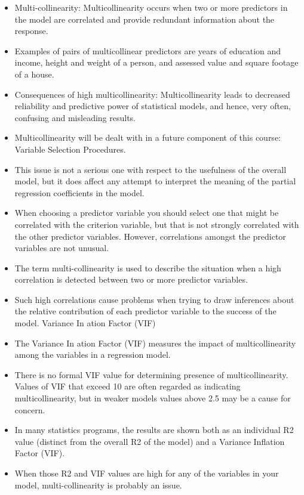 \documentclass[]{report}
\begin{document}
\begin{itemize}
	
	\item  Multi-collinearity: Multicollinearity occurs when two or more predictors in the model are correlated
	and provide redundant information about the response.
	\item  Examples of pairs of multicollinear predictors are years of education and income, height and weight of a
	person, and assessed value and square footage of a house.
	\item  Consequences of high multicollinearity:
	Multicollinearity leads to decreased reliability and predictive power of statistical models, and hence, very
	often, confusing and misleading results.
	\item  Multicollinearity will be dealt with in a future component of this course: Variable Selection Procedures.
	\item  This issue is not a serious one with respect to the usefulness of the overall model, but it does affect any attempt to interpret the meaning of the partial regression coefficients in the model.
	\item  When choosing a predictor variable you should select one that might be correlated with the criterion
	variable, but that is not strongly correlated with the other predictor variables. However, correlations
	amongst the predictor variables are not unusual.
	\item  The term multi-collinearity is used to describe the situation when a high correlation is detected between
	two or more predictor variables.
	\item  Such high correlations cause problems when trying to draw inferences about the relative contribution of
	each predictor variable to the success of the model.
	Variance In
	ation Factor (VIF)
	\item  The Variance In
	ation Factor (VIF) measures the impact of multicollinearity among the variables in a
	regression model.
	\item  There is no formal VIF value for determining presence of multicollinearity. Values of VIF that exceed 10
	are often regarded as indicating multicollinearity, but in weaker models values above 2.5 may be a cause
	for concern.
	\item  In many statistics programs, the results are shown both as an individual R2 value (distinct from the
	overall R2 of the model) and a Variance Inflation Factor (VIF).
	\item  When those R2 and VIF values are high for any of the variables in your model, multi-collinearity is
	probably an issue.
\end{itemize}
\end{document}

